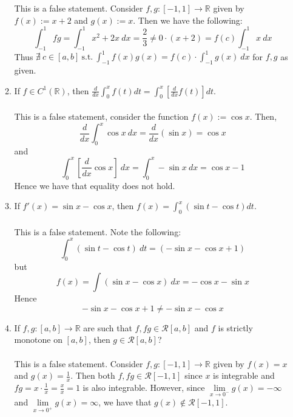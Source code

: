\documentclass[12pt,letterpaper]{article}
\newcommand{\limx}[2]{\displaystyle\lim\limits_{#1 \to #2}}
\newcommand{\st}{\ \text{s.t.}\ }
\newcommand{\R}{\mathbb{R}}
\theoremstyle{case}
\theoremstyle{definition}
\begin{document}
\begin{enumerate}
\begin{enumerate}
			\\\\This is a false statement. Consider $f,g:[-1,1] \to \R$ given by $f(x):=x+2$ and $g(x):=x$. Then we have the following:
			\[\int_{-1}^{1} fg = \int_{-1}^{1} x^2+2x\ dx = \frac{2}{3} \neq 0\cdot (x+2)=f(c) \int_{-1}^{1} x\ dx\]
			Thus $\nexists\ c \in [a,b] \st \displaystyle\int_{-1}^{1} f(x)g(x)=f(c) \cdot \int_{-1}^{1} g(x)\ dx$ for $f,g$ as given.
			\item If $f \in C^1(\R)$, then $\frac{d}{dx}\displaystyle\int_{0}^{x}f(t)dt = \int_{0}^{x}\left[\frac{d}{dx}f(t)\right]dt$.\\\\
			This is a false statement, consider the function $f(x):=\cos x$. Then,
			\[\frac{d}{dx}\int_{0}^{x} \cos x\ dx = \frac{d}{dx} (\sin x)=\cos x\]
			and
			\[\int_{0}^{x}\left[\frac{d}{dx}\cos x\right]\ dx = \int_{0}^{x} -\sin x\ dx = \cos x-1\]
			Hence we have that equality does not hold.\\
			\item If $f'(x)=\sin x - \cos x$, then $f(x)=\displaystyle\int_{0}^{x} (\sin t - \cos t) dt$.
			\\\\This is a false statement. Note the following:
			\[\int_{0}^{x} (\sin t - \cos t)\ dt = (-\sin x - \cos x + 1)\]
			but
			\[f(x)=\int (\sin x - \cos x)\ dx = -\cos x- \sin x\]
			Hence
			\[-\sin x - \cos x + 1 \neq -\sin x - \cos x\]
			\item If $f,g:[a,b] \to \R$ are such that $f,fg \in \mathcal{R}[a,b]$ and $f$ is strictly monotone on $[a,b]$, then $g \in \mathcal{R}[a,b]$?
			\\\\This is a false statement. Consider $f,g:[-1,1] \to \R$ given by $f(x)=x$ and $g(x)=\frac{1}{x}$. Then both $f, fg \in \mathcal{R}[-1,1]$ since $x$ is integrable and $fg=x \cdot \frac{1}{x} = \frac{x}{x}=1$ is also integrable. However, since $\limx{x}{0^-} g(x)=-\infty$ and $\limx{x}{0^+} g(x)=\infty$, we have that $g(x) \notin \mathcal{R}[-1,1]$.
		\end{enumerate}
	\end{enumerate}
\end{document}
